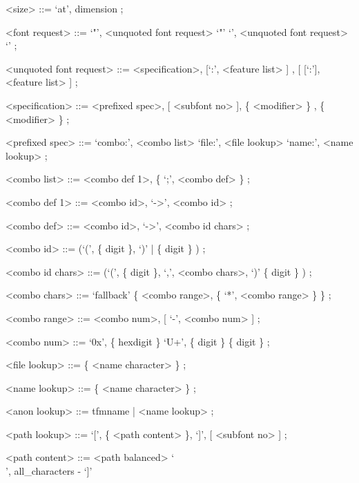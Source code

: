       <size>            ::= `at', {\sc dimension} ;

      <font request>    ::= `"', <unquoted font request> `"'
      \alt                  `{', <unquoted font request> `}'
       ;

      <unquoted font request> ::= <specification>, [`:', <feature list> ]
      , [ [`:'], <feature list> ] ;

      <specification>    ::= <prefixed spec>, [ <subfont no> ], \{ <modifier> \}
      , \{ <modifier> \} ;

      <prefixed spec>    ::= `combo:', <combo list>
      \alt                   `file:', <file lookup>
      \alt                   `name:', <name lookup> ;

      <combo list>       ::= <combo def 1>, \{ `;', <combo def>  \} ;

      <combo def 1>      ::= <combo id>, `->', <combo id> ;

      <combo def>        ::= <combo id>, `->', <combo id chars> ;

      <combo id>         ::= (`(', \{ {\sc digit} \}, `)' | \{ {\sc digit} \} ) ;

      <combo id chars>   ::= (`(', \{ {\sc digit} \}, `,', <combo chars>, `)'
      \alt                   \{ {\sc digit} \} ) ;

      <combo chars>      ::= `fallback'
      \alt                   \{ <combo range>, \{ `*', <combo range> \} \} ;

      <combo range>      ::= <combo num>, [ `-', <combo num> ] ;

      <combo num>        ::= `0x', \{ {\sc hexdigit}  \}
      \alt                   `U+', \{ {\sc digit} \}
      \alt                   \{ {\sc digit} \} ;

      <file lookup>      ::= \{ <name character> \} ;

      <name lookup>      ::= \{ <name character> \} ;

      <anon lookup>      ::= {\sc tfmname} | <name lookup> ;

      <path lookup>      ::= `[', \{ <path content> \}, `]', [ <subfont no> ] ;

      <path content>     ::= <path balanced>
      \alt                   `\\', {\sc all_characters}
       - `]'

